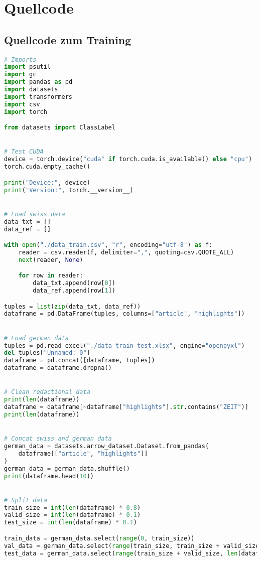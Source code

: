 \chapter*{Quellcode}

\section*{Quellcode zum Training}
\begin{lstlisting}[language=Python, caption=Quellcode zum Training]
# Imports
import psutil
import gc
import pandas as pd
import datasets
import transformers
import csv
import torch

from datasets import ClassLabel


# Test CUDA
device = torch.device("cuda" if torch.cuda.is_available() else "cpu")
torch.cuda.empty_cache()

print("Device:", device)
print("Version:", torch.__version__)


# Load swiss data
data_txt = []
data_ref = []

with open("./data_train.csv", "r", encoding="utf-8") as f:
    reader = csv.reader(f, delimiter=",", quoting=csv.QUOTE_ALL)
    next(reader, None)

    for row in reader:
        data_txt.append(row[0])
        data_ref.append(row[1])

tuples = list(zip(data_txt, data_ref))
dataframe = pd.DataFrame(tuples, columns=["article", "highlights"])


# Load german data
tuples = pd.read_excel("./data_train_test.xlsx", engine="openpyxl")
del tuples["Unnamed: 0"]
dataframe = pd.concat([dataframe, tuples])
dataframe = dataframe.dropna()


# Clean redactional data
print(len(dataframe))
dataframe = dataframe[~dataframe["highlights"].str.contains("ZEIT")]
print(len(dataframe))


# Concat swiss and german data
german_data = datasets.arrow_dataset.Dataset.from_pandas(
    dataframe[["article", "highlights"]]
)
german_data = german_data.shuffle()
print(dataframe.head(10))


# Split data
train_size = int(len(dataframe) * 0.8)
valid_size = int(len(dataframe) * 0.1)
test_size = int(len(dataframe) * 0.1)

train_data = german_data.select(range(0, train_size))
val_data = german_data.select(range(train_size, train_size + valid_size))
test_data = german_data.select(range(train_size + valid_size, len(dataframe)))



\end{lstlisting}
